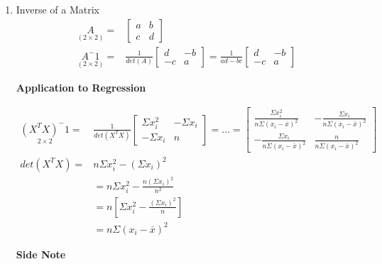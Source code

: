 \documentclass[11pt]{article}
\begin{document}
\begin{enumerate}
\item Inverse of a Matrix
\label{sec:org246a6c7}
\begin{equation}
\begin{split}
\underset{(2 \times 2)}{A} = &\begin{bmatrix}
a & b\\
c & d
\end{bmatrix}\\
\underset{(2 \times 2)}{A^-1} = & \frac{1}{det(A)} \begin{bmatrix}
d & -b\\
-c & a
\end{bmatrix} = \frac{1}{ad - bc} \begin{bmatrix}
d & -b\\
-c & a
\end{bmatrix}
\end{split}
\end{equation}

\textbf{Application to Regression}

\begin{equation}
\begin{split}
\underset{2 \times 2}{(X^T X)^-1} = & \frac{1}{det(X^T X)} \begin{bmatrix}
\Sigma x_i^2 & - \Sigma x_i\\
- \Sigma x_i & n
\end{bmatrix} = ... = \begin{bmatrix}
\frac{\Sigma x_i^2}{n \Sigma (x_i - \bar{x})^2} & - \frac{\Sigma x_i}{n \Sigma (x_i - \bar{x})^2}\\
- \frac{\Sigma x_i}{n \Sigma (x_i - \bar{x})^2} & \frac{n}{n \Sigma (x_i - \bar{x})^2}
\end{bmatrix}\\
det(X^T X) = & n \Sigma x_i^2 - (\Sigma x_i)^2\\
& = n \Sigma x_i^2 - \frac{n (\Sigma x_i)^2}{n^2}\\
& = n [ \Sigma x_i^2 - \frac{(\Sigma x_i)^2}{n}]\\
& = n \Sigma (x_i - \bar{x})^2
\end{split}
\end{equation}

\textbf{Side Note}


\end{enumerate}
\end{document}
